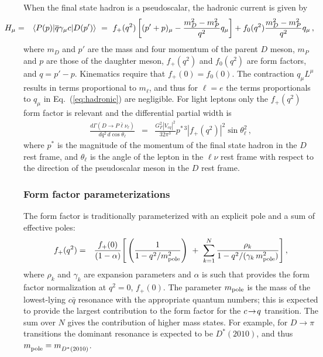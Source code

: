 When the final state hadron is a pseudoscalar, the hadronic 
current is given by
\begin{eqnarray}
\hspace{-1cm}
H_\mu & = & \left< P(p) | \bar{q}\gamma_\mu c | D(p') \right> \ =\  
f_+(q^2)\left[ (p' + p)_\mu -\frac{m_D^2-m_P^2}{q^2}q_\mu\right] + 
 f_0(q^2)\frac{m_D^2-m_P^2}{q^2}q_\mu\,,
\label{eq:hadronic}
\end{eqnarray}
where $m_D$ and $p'$ are the mass and four momentum of the 
parent $D$ meson, $m_P$ and $p$ are those of the daughter meson, 
$f_+(q^2)$ and $f_0(q^2)$ are form factors, and $q = p' - p$.  
Kinematics require that $f_+(0) = f_0(0)$.
The contraction $q_\mu L^\mu$ results in terms proportional 
to $m^{}_\ell$\cite{Gilman:1989uy}, and thus for $\ell=e $
the terms proportionals to $q_\mu$ in Eq.~(\ref{eq:hadronic}) are negligible. 
For light leptons only the $f_+(q^2)$ form factor 
is relevant and the differential partial width is
\begin{eqnarray}
\frac{d\Gamma(D \to P \bar \ell \nu_\ell)}{dq^2\, d\cos\theta_\ell} & = & 
   \frac{G_F^2|V_{cq}|^2}{32\pi^3} p^{*\,3}|f_{+}(q^2)|^2\sin\theta^2_\ell\,,
\label{eq:dGamma}
\end{eqnarray}
where ${p^*}$ is the magnitude of the momentum of the final state hadron
in the $D$ rest frame, and $\theta_\ell$ is the angle of the lepton in the 
$\ell\nu$ rest frame with respect to the direction of the pseudoscalar meson 
in the $D$ rest frame.


\subsubsection{Form factor parameterizations} 

The form factor is traditionally parameterized with an explicit pole 
and a sum of effective poles:
\begin{eqnarray}
f_+(q^2) & = & \frac{f_+(0)}{(1-\alpha)}\Bigg [
\left(\frac{1}{1- q^2/m^2_{\rm pole}}\right)\ +\ 
\sum_{k=1}^{N}\frac{\rho_k}{1- q^2/(\gamma_k\,m^2_{\rm pole})}\Bigg ]\,,
\label{eqn:expansion}
\end{eqnarray}
where $\rho_k$ and $\gamma_k$ are expansion parameters and $\alpha$ is such that provides the form factor normalization at $q^2=0$, $f_+(0)$. 
The parameter $m_{{\rm pole}}$ is the mass of the lowest-lying $c\bar{q}$ resonance
with the appropriate quantum numbers; this is expected to provide the
largest contribution to the form factor for the $c\!\rightarrow\! q$ transition. The sum over $N$ gives the contribution of higher mass states.  
For example, for $D\to\pi$ transitions the dominant resonance is
expected to be $D^*(2010)$, and thus $m^{}_{\rm pole}=m^{}_{D^*(2010)}$.

